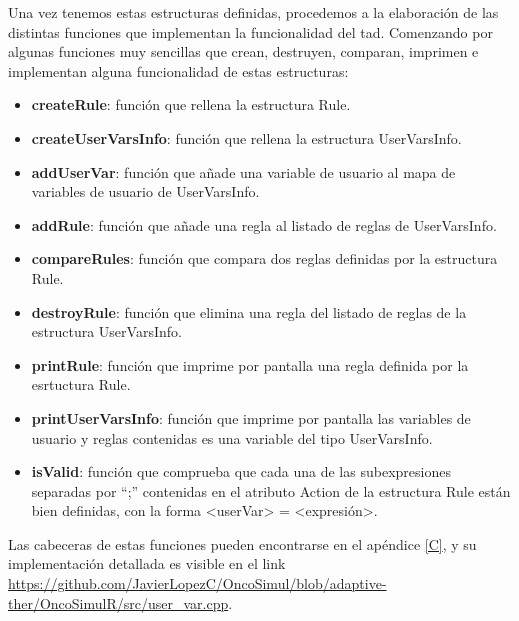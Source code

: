 Una vez tenemos estas estructuras definidas, procedemos a la elaboración de las distintas funciones que implementan la funcionalidad del \gls{tad}. Comenzando por algunas funciones muy sencillas que crean, destruyen, comparan, imprimen e implementan alguna funcionalidad de estas estructuras:

\begin{itemize}
	\item \textbf{createRule}: función que rellena la estructura Rule.
	\item \textbf{createUserVarsInfo}: función que rellena la estructura UserVarsInfo.
	\item \textbf{addUserVar}: función que añade una variable de usuario al mapa de variables de usuario de UserVarsInfo.
	\item \textbf{addRule}: función que añade una regla al listado de reglas de UserVarsInfo.
	\item \textbf{compareRules}: función que compara dos reglas definidas por la estructura Rule.
	\item \textbf{destroyRule}: función que elimina una regla del listado de reglas de la estructura UserVarsInfo.
	\item \textbf{printRule}: función que imprime por pantalla una regla definida por la esrtuctura Rule.
	\item \textbf{printUserVarsInfo}: función que imprime por pantalla las variables de usuario y reglas contenidas es una variable del tipo UserVarsInfo.
	\item \textbf{isValid}: función que comprueba que cada una de las subexpresiones separadas por ``;'' contenidas en el atributo Action de la estructura Rule están bien definidas, con la forma <userVar> = <expresión>.
\end{itemize}

Las cabeceras de estas funciones pueden encontrarse en el apéndice \ref{C}, y su implementación detallada es visible en el link \url{https://github.com/JavierLopezC/OncoSimul/blob/adaptive-ther/OncoSimulR/src/user_var.cpp}.


